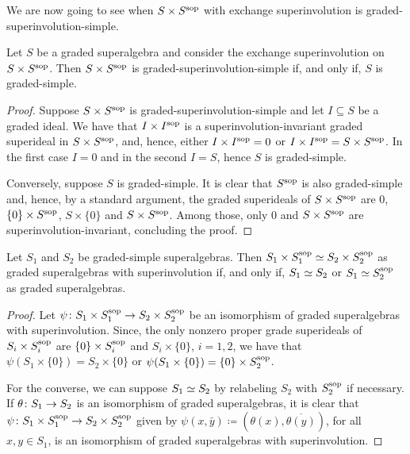 We are now going to see when $S\times S^{\mathrm{sop}}$ with exchange superinvolution is graded-superinvolution-simple.

\begin{lemma}\label{lemma:SxSsop-simple}
	Let $S$ be a graded superalgebra and consider the exchange superinvolution on $S \times S^{\mathrm{sop}}$. 
	Then $S \times S^{\mathrm{sop}}$ is graded-superinvolution-simple if, and only if, $S$ is graded-simple. 
\end{lemma}

\begin{proof}
    Suppose $S \times S^{\mathrm{sop}}$ is graded-superinvolution-simple and let $I \subseteq S$ be a graded ideal. 
    We have that $I \times I^{\mathrm{sop}}$ is a superinvolution-invariant graded superideal in $S \times S^{\mathrm{sop}}$, and, hence, either $I \times I^{\mathrm{sop}} = 0$ or $I \times I^{\mathrm{sop}} = S \times S^{\mathrm{sop}}$. 
    In the first case $I = 0$ and in the second $I = S$, hence $S$ is graded-simple. 
    
    Conversely, suppose $S$ is graded-simple. 
    It is clear that $S^{\mathrm{sop}}$ is also graded-simple and, hence, by a standard argument, the graded superideals of $S \times S^{\mathrm{sop}}$ are $0$, $\{ 0 \} \times S^{\mathrm{sop}}$, $S \times \{ 0 \}$ and $S\times S^{\mathrm{sop}}$. 
    Among those, only $0$ and $S\times S^{\mathrm{sop}}$ are superinvolution-invariant, concluding the proof. 
\end{proof}

\begin{lemma}\label{lemma:iso-SxSsop}
    Let $S_1$ and $S_2$ be graded-simple superalgebras. 
    Then $S_1\times S_1^{\mathrm{sop}} \simeq S_2\times S_2^{\mathrm{sop}}$ as graded superalgebras with superinvolution if, and only if, $S_1 \simeq S_2$ or $S_1 \simeq S_2^{\mathrm{sop}}$ as graded superalgebras.
\end{lemma}

\begin{proof}
    Let $\psi\colon S_1\times S_1^{\mathrm{sop}} \to S_2\times S_2^{\mathrm{sop}}$ be an isomorphism of graded superalgebras with superinvolution. 
    Since, the only nonzero proper grade superideals of $S_i \times S_i^{\mathrm{sop}}$ are $\{ 0 \} \times S_i^{\mathrm{sop}}$ and $S_i\times \{ 0 \}$, $i = 1,2$, we have that $\psi(S_1\times \{ 0 \}) = S_2\times \{ 0 \}$ or $\psi(S_1\times \{ 0 \}) = \{ 0 \} \times S_2^{\mathrm{sop}}$.  
    
    For the converse, we can suppose $S_1 \simeq S_2$ by relabeling $S_2$ with $S_2^{\mathrm{sop}}$ if necessary. 
    If $\theta \colon S_1 \to S_2$ is an isomorphism of graded superalgebras, it is clear that $\psi\colon S_1\times S_1^{\mathrm{sop}} \to S_2\times S_2^{\mathrm{sop}}$ given by $\psi (x, \bar {y}) \coloneqq (\theta(x), \overline{\theta(y)})$, for all $x,y \in S_1$, is an isomorphism of graded superalgebras with superinvolution. 
\end{proof}


